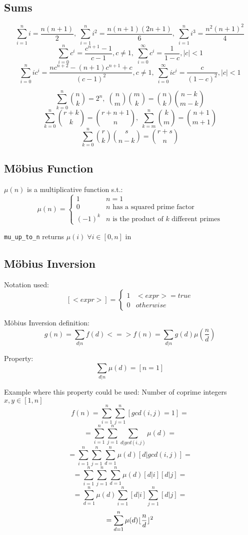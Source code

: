 \subsection{Sums}
\[\sum_{i=1}^{n}{i} = \frac{n(n+1)}{2},\; \sum_{i=1}^{n}{i^2} = \frac{n(n+1)(2n+1)}{6},\; \sum_{i=1}^{n}{i^3} = \frac{n^2(n+1)^2}{4}\]
\[\sum_{i=0}^{n}{c^i} = \frac{c^{n+1}-1}{c-1}, c \neq 1,\; \sum_{i=0}^{\infty}{c^i} = \frac{1}{1-c}, |c| < 1\]
\[\sum_{i=0}^{n}{ic^i} = \frac{nc^{n+2}-(n+1)c^{n+1}+c}{(c-1)^2}, c \neq 1,\; \sum_{i=0}^{\infty}{ic^i} = \frac{c}{(1-c)^2}, |c| < 1\]

\[\sum_{k=0}^{n}{\binom{n}{k}} = 2^n,\; \binom{n}{m}\binom{m}{k} = \binom{n}{k}\binom{n-k}{m-k}\]
\[\sum_{k=0}^{n}{\binom{r+k}{k}} = \binom{r+n+1}{n},\; \sum_{k=m}^{n}{\binom{k}{m}} = \binom{n+1}{m+1}\]
\[\sum_{k=0}^{n}{\binom{r}{k}\binom{s}{n-k} = \binom{r+s}{n}}\]


\subsection{Möbius Function}
$\mu(n)$ is a multiplicative function s.t.: \\
\[\mu(n) =
	\begin{cases}
		1 & n = 1 \\
		0 & \textrm{$n$ has a squared prime factor} \\
		(-1)^k & \textrm{$n$ is the product of $k$ different primes}
	\end{cases}
\]

\verb|mu_up_to_n| returns $\mu(i) \; \forall i \in [0, n]$ in 



\subsection{Möbius Inversion}
Notation used:
\[[<expr>] =
	\begin{cases}
		1 & <expr> = true \\
		0 & otherwise
	\end{cases}
\]

Möbius Inversion definition:
\[g(n) = \sum_{d|n}f(d) <=> f(n) = \sum_{d|n}g(d)\mu(\frac{n}{d})\]

Property:
\[\sum_{d|n}\mu(d) = [n = 1]\]

Example where this property could be used:
Number of coprime integers $x, y \in [1, n]$
\[f(n) = \sum_{i=1}^{n}\sum_{j=1}^{n}[gcd(i,j) = 1] =\]
\[= \sum_{i=1}^{n}\sum_{j=1}^{n}\sum_{d|gcd(i,j)}\mu(d) =\]
\[= \sum_{i=1}^{n}\sum_{j=1}^{n}\sum_{d=1}^{n}\mu(d)[d | gcd(i, j)] =\]
\[= \sum_{i=1}^{n}\sum_{j=1}^{n}\sum_{d=1}^{n}\mu(d)[d | i][d | j] =\]
\[= \sum_{d=1}^{n}\mu(d)\sum_{i=1}^{n}[d | i]\sum_{j=1}^{n}[d | j] =\]
\[= \sum_{d=1}^{n}\mu(d)\lfloor\frac{n}{d}\rfloor^2\]


